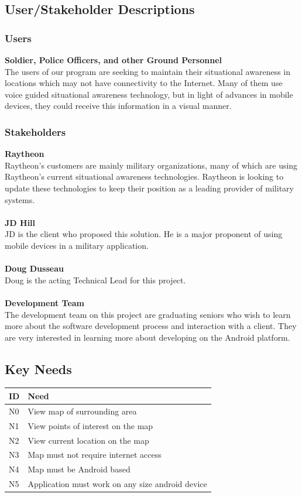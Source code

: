 \documentclass{article}
\begin{document}
\subsection{User/Stakeholder Descriptions}
\subsubsection{Users} 
\textbf{Soldier, Police Officers, and other Ground Personnel}\\
The users of our program are seeking to maintain their situational awareness in locations which may not have connectivity to the Internet.  Many of them use voice guided situational awareness technology, but in light of advances in mobile devices, they could receive this information in a visual manner.  

\subsubsection{Stakeholders}
\textbf{Raytheon}\\
Raytheon's customers are mainly military organizations, many of which are using Raytheon's current situational awareness technologies.  Raytheon is looking to update these technologies to keep their position as a leading provider of military systems.\\ \\
\textbf{JD Hill}\\
JD is the client who proposed this solution.  He is a major proponent of using mobile devices in a military application.\\ \\
\textbf{Doug Dusseau}\\
Doug is the acting Technical Lead for this project. \\ \\
\textbf{Development Team}\\
The development team on this project are graduating seniors who wish to learn more about the software development process and interaction with a client.  They are very interested in learning more about developing on the Android platform.

\subsection{Key Needs}

\begin{tabular}{ | p{.5in} | p{4.5in} | }
\hline
\textbf{ID} & \textbf{Need}\\
\hline
\hline
N0 & View map of surrounding area\\
\hline
N1 & View points of interest on the map\\
\hline
N2 & View current location on the map\\
\hline
N3 & Map must not require internet access\\
\hline
N4 & Map must be Android based\\
\hline
N5 & Application must work on any size android device\\
\hline
\end{tabular}
\end{document}
